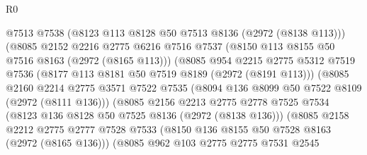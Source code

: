 \begin{lexlean}{R0}
\begin{coremodule}
                                  @7513
                                  @7538
                                  (@8123 @113 @8128 @50 @7513 @8136 (@2972 (@8138 @113)))
                                  (@8085
                                    @2152
                                    @2216
                                    @2775
                                    @6216
                                    @7516
                                    @7537
                                    (@8150 @113 @8155 @50 @7516 @8163 (@2972 (@8165 @113)))
                                    (@8085
                                      @954
                                      @2215
                                      @2775
                                      @5312
                                      @7519
                                      @7536
                                      (@8177 @113 @8181 @50 @7519 @8189 (@2972 (@8191 @113)))
                                      (@8085
                                        @2160
                                        @2214
                                        @2775
                                        @3571
                                        @7522
                                        @7535
                                        (@8094 @136 @8099 @50 @7522 @8109 (@2972 (@8111 @136)))
                                        (@8085
                                          @2156
                                          @2213
                                          @2775
                                          @2778
                                          @7525
                                          @7534
                                          (@8123 @136 @8128 @50 @7525 @8136 (@2972 (@8138 @136)))
                                          (@8085
                                            @2158
                                            @2212
                                            @2775
                                            @2777
                                            @7528
                                            @7533
                                            (@8150 @136 @8155 @50 @7528 @8163 (@2972 (@8165 @136)))
                                            (@8085
                                              @962
                                              @103
                                              @2775
                                              @2775
                                              @7531
                                              @2545

\end{coremodule}
\end{lexlean}
